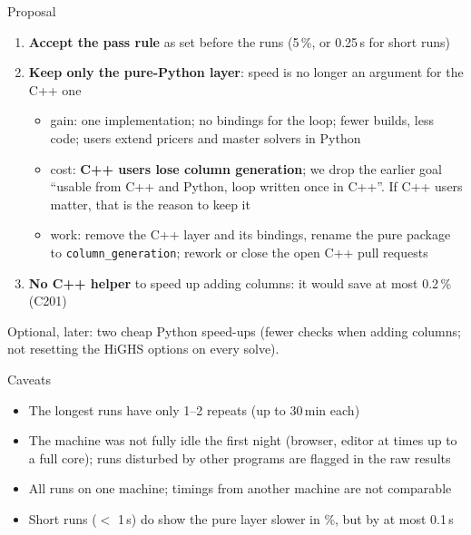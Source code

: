 \documentclass[aspectratio=169]{beamer}
\begin{document}
\begin{frame}{Proposal}
  \begin{enumerate}
    \item \textbf{Accept the pass rule} as set before the runs (5\,\%, or 0.25\,s for short runs)
    \item \textbf{Keep only the pure-Python layer}: speed is no longer an argument for the C++ one
      \begin{itemize}\small
        \item gain: one implementation; no bindings for the loop; fewer builds, less code; users extend pricers
          and master solvers in Python
        \item cost: \textbf{C++ users lose column generation}; we drop the earlier goal ``usable from C++ and
          Python, loop written once in C++''. If C++ users matter, that is the reason to keep it
        \item work: remove the C++ layer and its bindings, rename the pure package to
          \texttt{column\_generation}; rework or close the open C++ pull requests
      \end{itemize}
    \item \textbf{No C++ helper} to speed up adding columns: it would save at most 0.2\,\% (C201)
  \end{enumerate}

  \vspace{0.4em}
  \small Optional, later: two cheap Python speed-ups (fewer checks when adding columns; not resetting the HiGHS
  options on every solve).
\end{frame}

\begin{frame}{Caveats}
  \begin{itemize}
    \item The longest runs have only 1--2 repeats (up to 30\,min each)
    \item The machine was not fully idle the first night (browser, editor at times up to a full core); runs
      disturbed by other programs are flagged in the raw results
    \item All runs on one machine; timings from another machine are not comparable
    \item Short runs ($<$ 1\,s) do show the pure layer slower in \%, but by at most 0.1\,s
  \end{itemize}
\end{frame}
\end{document}
